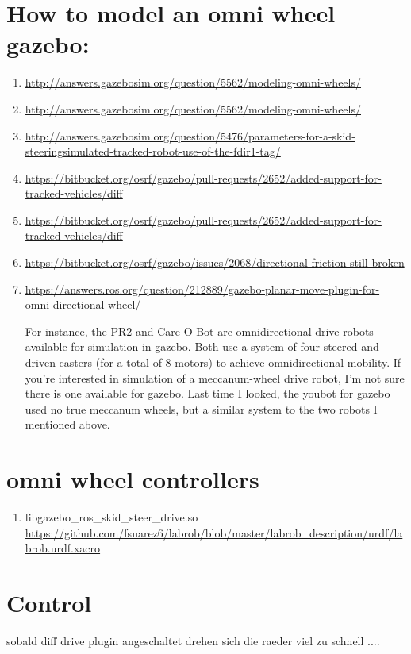 \documentclass[twoside,colorback,accentcolor=tud4c,11pt]{tudreport}
\begin{document}
\section{How to model an omni wheel gazebo:}
\begin{enumerate}
	\item \url{http://answers.gazebosim.org/question/5562/modeling-omni-wheels/}
	\item \url{http://answers.gazebosim.org/question/5562/modeling-omni-wheels/}
	\item \url{http://answers.gazebosim.org/question/5476/parameters-for-a-skid-steeringsimulated-tracked-robot-use-of-the-fdir1-tag/}
	\item \url{https://bitbucket.org/osrf/gazebo/pull-requests/2652/added-support-for-tracked-vehicles/diff}
	\item \url{https://bitbucket.org/osrf/gazebo/pull-requests/2652/added-support-for-tracked-vehicles/diff}
	\item \url{https://bitbucket.org/osrf/gazebo/issues/2068/directional-friction-still-broken}
	
	\item \url{https://answers.ros.org/question/212889/gazebo-planar-move-plugin-for-omni-directional-wheel/}
	
	
	For instance, the PR2 and Care-O-Bot are omnidirectional drive robots available for simulation in gazebo. Both use a system of four steered and driven casters (for a total of 8 motors) to achieve omnidirectional mobility. If you're interested in simulation of a meccanum-wheel drive robot, I'm not sure there is one available for gazebo. Last time I looked, the youbot for gazebo used no true meccanum wheels, but a similar system to the two robots I mentioned above.
\end{enumerate}

\section{omni wheel controllers}
\begin{enumerate}
	\item libgazebo\_ros\_skid\_steer\_drive.so \url{https://github.com/fsuarez6/labrob/blob/master/labrob_description/urdf/labrob.urdf.xacro}
\end{enumerate}
	
	\section{Control}
	sobald diff drive plugin angeschaltet drehen sich die raeder viel zu schnell ....
	
\end{document}
